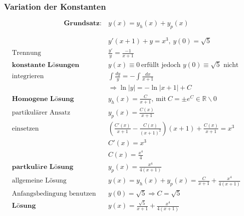 \clearpage

\subsubsection{Variation der Konstanten}

\begin{equation*}
	\textbf{Grundsatz:}\quad y(x) = y_h(x) + y_p(x)
\end{equation*}

\begin{equation*}
\begin{split}
	& y'(x+1) + y = x^3,\ y(0) = \sqrt{5} \\
	\text{Trennung}\quad & \frac{y'}{y} = \frac{-1}{x+1} \\
	\textbf{konstante L{\"o}sungen}\quad & y(x) \equiv 0\ \text{erf{\"u}llt jedoch $y(0) \equiv \sqrt{5}$ nicht} \\
	\text{integrieren}\quad & \int \frac{dy}{y} = - \int \frac{dx}{x+1} \\
	& \Rightarrow \ln|y| = -\ln|x+1| + C \\
	\textbf{Homogene L{\"o}sung} \quad & y_h(x) = \frac{C}{x+1},\ \text{mit}\ C= \pm e^C \in \mathbb{R}\backslash{0} \\
	\text{partikul{\"a}rer Ansatz}\quad & y_p(x) = \frac{C(x)}{x+1} \\
	\text{einsetzen} \quad & (\frac{C'(x)}{x+1} - \frac{C(x)}{(x+1)^2})(x+1) + \frac{C(x)}{x+1} = x^3 \\
	& C'(x) = x^3 \\
	& C(x) = \frac{x^4}{4} \\
	\textbf{partkul{\"a}re L{\"o}sung} \quad & y_p(x) = \frac{x^4}{4(x+1)} \\
	\text{allgemeine L{\"o}sung}\quad & y(x) = y_h(x) + y_p(x) = \frac{C}{x+1} + \frac{x^4}{4(x+1)} \\
	\text{Anfangsbedingung benutzen} \quad & y(0) = \sqrt{5} \Rightarrow C = \sqrt{5} \\
	\textbf{L{\"o}sung} \quad & y(x) = \frac{\sqrt{5}}{x+1} + \frac{x^4}{4(x+1)}
\end{split}
\end{equation*}

%



